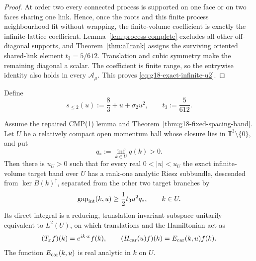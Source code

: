 \begin{proof}
At order two every connected process is supported on one face or on two
faces sharing one link.  Hence, once the roots and this finite process
neighbourhood fit without wrapping, the finite-volume coefficient is exactly
the infinite-lattice coefficient.  Lemma~\ref{lem:process-complete} excludes
all other off-diagonal supports, and
Theorem~\ref{thm:allrank} assigns the surviving oriented shared-link element
$t_3=5/612$.  Translation and cubic symmetry make the remaining diagonal a
scalar.  The coefficient is finite range, so the entrywise identity also
holds in every $\mathcal A_\mu$.  This proves
\eqref{eq:g18-exact-infinite-u2}.
\end{proof}

Define
\begin{equation}
 s_{\le2}(u):=\frac83+u+\sigma_2u^2,\qquad t_3:=\frac5{612}.
 \label{eq:g18-s2-definition}
\end{equation}

\begin{theorem}
\label{thm:g18-exact-fixed-k-carrier}
Assume the repaired CMP(1) lemma and
Theorem~\ref{thm:g18-fixed-spacing-band}.  Let $U$ be a relatively compact
open momentum ball whose closure lies in
$\mathbb T^3\setminus\{0\}$, and put
\[
 q_*:=\inf_{k\in U}q(k)>0.
\]
Then there is $u_U>0$ such that for every real
$0<|u|<u_U$ the exact infinite-volume target band over $U$ has a rank-one
analytic Riesz subbundle, descended from $\ker B(k)^\dagger$, separated from
the other two target branches by
\begin{equation}
 \operatorname{gap}_{\rm int}(k,u)
 \ge\frac12t_3u^2q_*,
 \qquad k\in U.
 \label{eq:g18-closed-internal-gap}
\end{equation}
Its direct integral is a reducing, translation-invariant subspace unitarily
equivalent to $L^2(U)$, on which translations and the Hamiltonian act as
\begin{equation}
 (T_xf)(k)=e^{ik\cdot x}f(k),
 \qquad
 (H_{\rm car}(u)f)(k)=E_{\rm car}(k,u)f(k).
 \label{eq:g18-carrier-representation-closed}
\end{equation}
The function $E_{\rm car}(k,u)$ is real analytic in $k$ on $U$.
\end{theorem}

